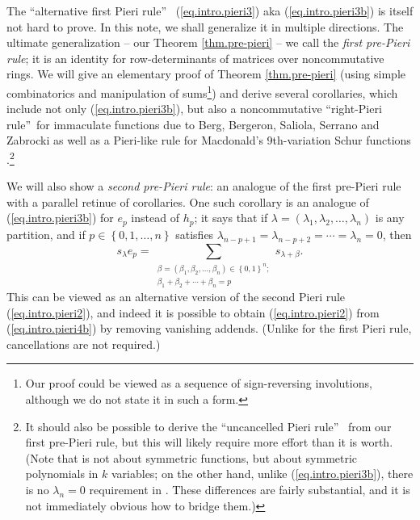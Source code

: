 \documentclass[numbers=enddot,12pt,final,onecolumn,notitlepage,english]{scrartcl}%
\theoremstyle{definition}
\let\sumnonlimits\sum
\renewcommand{\sum}{\sumnonlimits\limits}
\begin{document}
The \textquotedblleft alternative first Pieri rule\textquotedblright%
\ (\ref{eq.intro.pieri3}) aka (\ref{eq.intro.pieri3b}) is itself not hard to
prove. In this note, we shall generalize it in multiple directions. The
ultimate generalization -- our Theorem \ref{thm.pre-pieri} -- we call the
\emph{first pre-Pieri rule}; it is an identity for row-determinants of
matrices over noncommutative rings. We will give an elementary proof of
Theorem \ref{thm.pre-pieri} (using simple combinatorics and manipulation of
sums\footnote{Our proof could be viewed as a sequence of sign-reversing
involutions, although we do not state it in such a form.}) and derive several
corollaries, which include not only (\ref{eq.intro.pieri3b}), but also a
noncommutative \textquotedblleft right-Pieri rule\textquotedblright\ for
immaculate functions due to Berg, Bergeron, Saliola, Serrano and Zabrocki
\cite[Theorem 3.5]{BBSSZ13} as well as a Pieri-like rule for Macdonald's
9th-variation Schur functions \cite[Proposition 3.9]{Fun}.\footnote{It should
also be possible to derive the \textquotedblleft uncancelled Pieri
rule\textquotedblright\ \cite[Theorem 11.7]{basisquot} from our first
pre-Pieri rule, but this will likely require more effort than it is worth.
(Note that \cite[Theorem 11.7]{basisquot} is not about symmetric functions,
but about symmetric polynomials in $k$ variables; on the other hand, unlike
(\ref{eq.intro.pieri3b}), there is no $\lambda_{n}=0$ requirement in
\cite[Theorem 11.7]{basisquot}. These differences are fairly substantial, and
it is not immediately obvious how to bridge them.)}

We will also show a \emph{second pre-Pieri rule}: an analogue of the first
pre-Pieri rule with a parallel retinue of corollaries. One such corollary is
an analogue of (\ref{eq.intro.pieri3b}) for $e_{p}$ instead of $h_{p}$; it
says that if $\lambda=\left(  \lambda_{1},\lambda_{2},\ldots,\lambda
_{n}\right)  $ is any partition, and if $p\in\left\{  0,1,\ldots,n\right\}  $
satisfies $\lambda_{n-p+1}=\lambda_{n-p+2}=\cdots=\lambda_{n}=0$, then%
\begin{equation}
s_{\lambda}e_{p}=\sum_{\substack{\beta=\left(  \beta_{1},\beta_{2}%
,\ldots,\beta_{n}\right)  \in\left\{  0,1\right\}  ^{n};\\\beta_{1}+\beta
_{2}+\cdots+\beta_{n}=p}}s_{\lambda+\beta}. \label{eq.intro.pieri4b}%
\end{equation}
This can be viewed as an alternative version of the second Pieri rule
(\ref{eq.intro.pieri2}), and indeed it is possible to obtain
(\ref{eq.intro.pieri2}) from (\ref{eq.intro.pieri4b}) by removing vanishing
addends. (Unlike for the first Pieri rule, cancellations are not required.)
\end{document}
